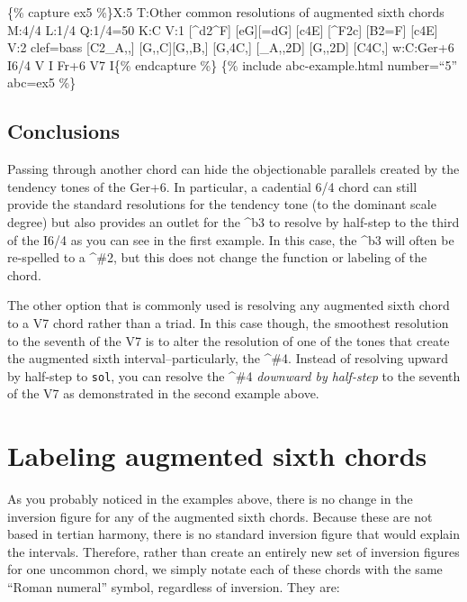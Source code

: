 \documentclass{book}
\begin{document}
\{\% capture ex5 \%\}X:5 T:Other common resolutions of augmented sixth chords
M:4/4 L:1/4 Q:1/4=50 K:C V:1 {[}\^{}d2\^{}F{]} {[}eG{]}{[}=dG{]}\textbar{}
{[}c4E{]}\textbar\textbar{} {[}\^{}F2c{]} {[}B2=F{]}\textbar{}
{[}c4E{]}\textbar{]} V:2 clef=bass {[}C2\_A,,{]}
{[}G,,C{]}{[}G,,B,{]}\textbar{} {[}G,4C,{]}\textbar\textbar{} {[}\_A,,2D{]}
{[}G,,2D{]}\textbar{} {[}C4C,{]}\textbar\textbar{]} w:C:Ger+6 I6/4 V I Fr+6 V7
I\{\% endcapture \%\} \{\% include abc-example.html number=``5'' abc=ex5 \%\}

\hypertarget{conclusions-6}{%
\subsection{Conclusions}\label{conclusions-6}}

Passing through another chord can hide the objectionable parallels created by
the tendency tones of the Ger+6. In particular, a cadential 6/4 chord can
still provide the standard resolutions for the tendency tone (to the dominant
scale degree) but also provides an outlet for the \^{}b3 to resolve by
half-step to the third of the I6/4 as you can see in the first example. In
this case, the \^{}b3 will often be re-spelled to a \^{}\#2, but this does not
change the function or labeling of the chord.

The other option that is commonly used is resolving any augmented sixth chord
to a V7 chord rather than a triad. In this case though, the smoothest
resolution to the seventh of the V7 is to alter the resolution of one of the
tones that create the augmented sixth interval--particularly, the \^{}\#4.
Instead of resolving upward by half-step to \texttt{sol}, you can resolve the
\^{}\#4 \emph{downward by half-step} to the seventh of the V7 as demonstrated
in the second example above.

\hypertarget{labeling-augmented-sixth-chords}{%
\section{Labeling augmented sixth
chords}\label{labeling-augmented-sixth-chords}}

As you probably noticed in the examples above, there is no change in the
inversion figure for any of the augmented sixth chords. Because these are not
based in tertian harmony, there is no standard inversion figure that would
explain the intervals. Therefore, rather than create an entirely new set of
inversion figures for one uncommon chord, we simply notate each of these
chords with the same ``Roman numeral'' symbol, regardless of inversion. They
are:
\end{document}

